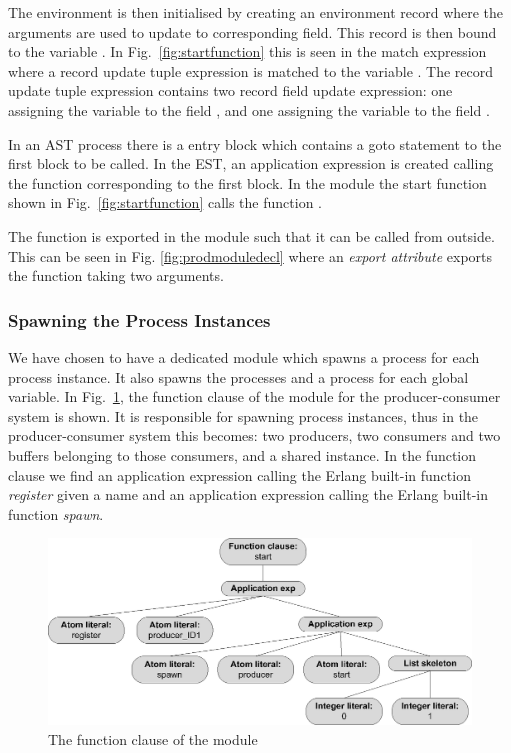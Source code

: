The environment is then initialised by creating an environment record where the arguments are used to update to corresponding field. This record is then bound to the variable . In Fig.~\ref{fig:startfunction} this is seen in the match expression where a record update tuple expression is matched to the variable . The record update tuple expression contains two record field update expression: one assigning the variable  to the field , and one assigning the variable  to the field .

In an AST process there is a entry block which contains a goto statement to the first block to be called. In the EST, an application expression is created calling the function corresponding to the first block. In the  module the start function shown in Fig.~\ref{fig:startfunction} calls the function .

The  function is exported in the module such that it can be called from outside. This can be seen in Fig. \ref{fig:prodmoduledecl} where an \emph{export attribute} exports the  function taking two arguments.

\subsubsection{Spawning the Process Instances}
We have chosen to have a dedicated module which spawns a process for each process instance. It also spawns the  processes and a  process for each global variable. In Fig.~\ref{fig:systemmoduledecl}, the  function clause of the  module for the producer-consumer system is shown. It is responsible for spawning process instances, thus in the producer-consumer system this becomes: two producers, two consumers and two buffers belonging to those consumers, and a shared instance. In the  function clause we find an application expression calling the Erlang built-in function \emph{register} given a name and an application expression calling the Erlang built-in function \emph{spawn}.

\begin{figure}[h]
\centering
\includegraphics[width=\textwidth]{translation/ast_to_est/graphics/producerest06.eps}
\caption{The function clause  of the  module}
\label{fig:systemmoduledecl}
\end{figure}

